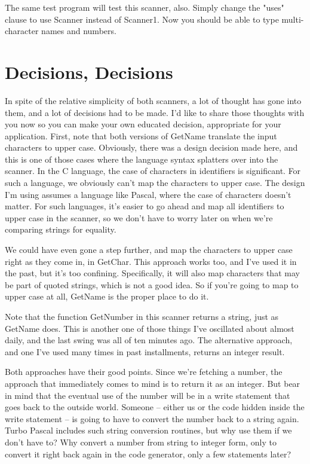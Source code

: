 \documentclass[float=false, crop=false]{standalone}
\begin{document}
The same test program will test this scanner, also. Simply change the "uses"
clause to use Scanner instead of Scanner1. Now you should be able to type
multi-character names and numbers.


\section{Decisions, Decisions}

In spite of the relative simplicity of both scanners, a lot of thought has gone
into them, and a lot of decisions had to be made. I'd like to share those
thoughts with you now so you can make your own educated decision, appropriate
for your application. First, note that both versions of GetName translate the
input characters to upper case. Obviously, there was a design decision made
here, and this is one of those cases where the language syntax splatters over
into the scanner. In the C language, the case of characters in identifiers is
significant. For such a language, we obviously can't map the characters to upper
case. The design I'm using assumes a language like Pascal, where the case of
characters doesn't matter. For such languages, it's easier to go ahead and map
all identifiers to upper case in the scanner, so we don't have to worry later on
when we're comparing strings for equality.

We could have even gone a step further, and map the characters to upper case
right as they come in, in GetChar. This approach works too, and I've used it in
the past, but it's too confining. Specifically, it will also map characters that
may be part of quoted strings, which is not a good idea. So if you're going to
map to upper case at all, GetName is the proper place to do it.

Note that the function GetNumber in this scanner returns a string, just as
GetName does. This is another one of those things I've oscillated about almost
daily, and the last swing was all of ten minutes ago. The alternative approach,
and one I've used many times in past installments, returns an integer result.

Both approaches have their good points. Since we're fetching a number, the
approach that immediately comes to mind is to return it as an integer. But bear
in mind that the eventual use of the number will be in a write statement that
goes back to the outside world. Someone -- either us or the code hidden inside
the write statement -- is going to have to convert the number back to a string
again. Turbo Pascal includes such string conversion routines, but why use them
if we don't have to? Why convert a number from string to integer form, only to
convert it right back again in the code generator, only a few statements later?
\end{document}
